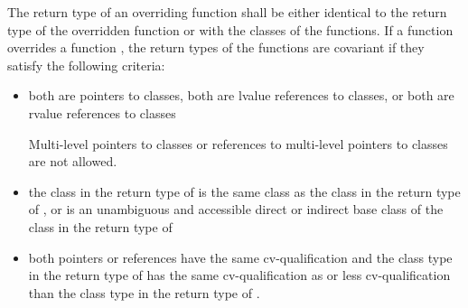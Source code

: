\pnum
The return type of an overriding function shall be either identical to
the return type of the overridden function or  with
the classes of the functions. If a function  overrides a
function , the return types of the functions are covariant
if they satisfy the following criteria:
\begin{itemize}
\item both are pointers to classes, both are lvalue references to
classes, or both are rvalue references to classes
\begin{footnote}
Multi-level pointers to classes or references to multi-level pointers to
classes are not allowed.%
\end{footnote}

\item the class in the return type of  is the same class as
the class in the return type of , or is an unambiguous and
accessible direct or indirect base class of the class in the return type
of 

\item both pointers or references have the same cv-qualification and the
class type in the return type of  has the same
cv-qualification as or less cv-qualification than the class type in the
return type of .
\end{itemize}

